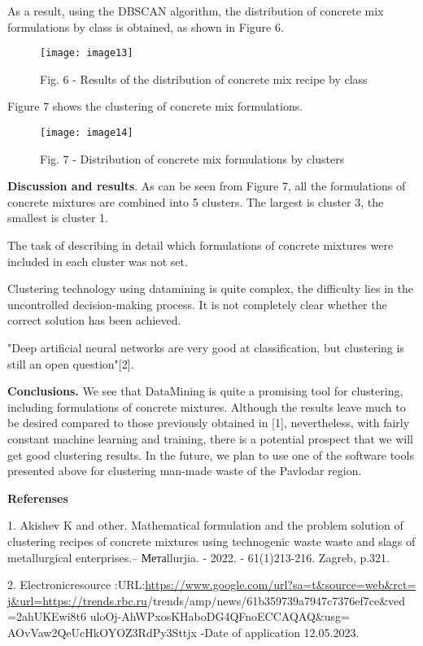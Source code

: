 As a result, using the DBSCAN algorithm, the distribution of concrete
mix formulations by class is obtained, as shown in Figure 6.

\begin{figure}
  \centering
  \texttt{[image: image13]}
  \caption*{Fig. 6 - Results of the distribution of concrete mix recipe by class}
\end{figure}

Figure 7 shows the clustering of concrete mix formulations.

\begin{figure}
  \centering
  \texttt{[image: image14]}
  \caption*{Fig. 7 - Distribution of concrete mix formulations by clusters}
\end{figure}

{\bfseries Discussion and results}. As can be seen from Figure 7, all the
formulations of concrete mixtures are combined into 5 clusters. The
largest is cluster 3, the smallest is cluster 1.

The task of describing in detail which formulations of concrete mixtures
were included in each cluster was not set.

Clustering technology using datamining is quite complex, the difficulty
lies in the uncontrolled decision-making process. It is not completely
clear whether the correct solution has been achieved.

"Deep artificial neural networks are very good at classification, but
clustering is still an open question"{[}2{]}.

{\bfseries Conclusions.} We see that DataMining is quite a promising tool
for clustering, including formulations of concrete mixtures. Although
the results leave much to be desired compared to those previously
obtained in {[}1{]}, nevertheless, with fairly constant machine learning
and training, there is a potential prospect that we will get good
clustering results. In the future, we plan to use one of the software
tools presented above for clustering man-made waste of the Pavlodar
region.

{\bfseries Referenses}

1. Akishev K and other. Mathematical formulation and the problem
solution of clustering recipes of concrete mixtures using technogenic
waste waste and slags of metallurgical enterprises.-- Метаllurjia. -
2022. - 61(1)213-216. Zagreb, p.321.

2. Electronicresource
:URL:\href{https://www.google.com/url?sa=t\&source=web\&rct=\%20j\&url=https://trends.rbc.ru}{https://www.google.com/url?sa=t\&source=web\&rct=
j\&url=https://trends.rbc.ru}/trends/amp/news/61b359739a7947c7376ef7ce\&ved
=2ahUKEwi8t6 uloOj-AhWPxosKHaboDG4QFnoECCAQAQ\&usg=
AOvVaw2QeUcHkOYOZ3RdPy3Sttjx -Date of application 12.05.2023.

